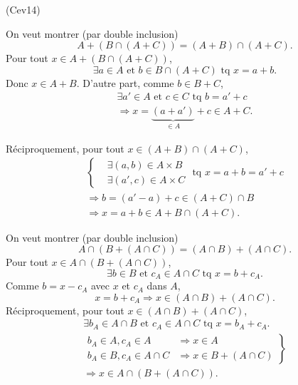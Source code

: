 \begin{tiny}(Cev14)\end{tiny} On veut montrer (par double inclusion) 
\[ 
A+\left( B\cap(A+C)\right) = (A+B)\cap(A+C) . 
\]
Pour tout $x \in A+\left( B\cap(A+C)\right)$,
\[
 \exists a \in A \text{ et } b \in B\cap(A + C) \text{ tq } x = a + b.
\]
Donc $x \in A + B$. D'autre part, comme $b \in B + C$,
\begin{multline*}
  \exists a' \in A\text{ et } c \in C \text{ tq } b = a' + c \\
  \Rightarrow x = \underset{\in A }{\underbrace{(a + a')}} + c \in A + C . 
\end{multline*}

Réciproquement, pour tout $x \in (A+B) \cap (A+C)$,
\begin{multline*}
  \left\lbrace
  \begin{aligned}
    &\exists (a,b) \in A\times B \\
    &\exists (a',c) \in A\times C 
  \end{aligned}
\right.
\text{ tq } x = a+b = a' + c\\
\Rightarrow b = (a' - a) + c \in (A + C)\cap B \\
\Rightarrow x = a + b \in A + B\cap (A + C).
\end{multline*}

On veut montrer (par double inclusion) 
\[ 
A\cap \left( B+(A\cap C)\right) = (A\cap B)+(A\cap C). 
\]
Pour tout $x \in A\cap \left( B+(A\cap C)\right)$,
\[
  \exists b \in B \text{ et } c_A \in A\cap C \text{ tq } x = b + c_A.
\]
Comme $b = x - c_A$ avec $x$ et $c_A$ dans $A$, 
\[
  x = b + c_A \Rightarrow x \in (A\cap B) + (A \cap C).
\]
Réciproquement, pour tout $x \in (A\cap B)+(A\cap C)$,
\begin{multline*}
  \exists b_A \in A\cap B \text{ et } c_A \in A\cap C \text{ tq }
  x = b_A + c_A.\\
\left.
\begin{aligned}
  b_A \in A, c_A \in A &\Rightarrow x \in A \\
  b_A \in B, c_A \in A \cap C &\Rightarrow x \in B + (A \cap C)
\end{aligned} 
\right\rbrace\\
\Rightarrow x \in A \cap ( B + (A \cap C)).
\end{multline*}

